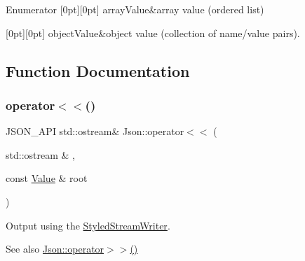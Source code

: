 \begin{DoxyEnumFields}{Enumerator}
[0pt][0pt]{}\mbox{\label{namespace_json_a7d654b75c16a57007925868e38212b4eadc8f264f36b55b063c78126b335415f4}} 
array\+Value&array value (ordered list) \\
\hline

[0pt][0pt]{}\mbox{\label{namespace_json_a7d654b75c16a57007925868e38212b4eae8386dcfc36d1ae897745f7b4f77a1f6}} 
object\+Value&object value (collection of name/value pairs). \\
\hline

\end{DoxyEnumFields}


\subsection{Function Documentation}
\mbox{\label{namespace_json_a0ef6e98bafd4dba52f6ef28ed33913f4}} 
\subsubsection{\texorpdfstring{operator$<$$<$()}{operator<<()}}
{\footnotesize\ttfamily J\+S\+O\+N\+\_\+\+A\+PI std\+::ostream\& Json\+::operator$<$$<$ (\begin{DoxyParamCaption}\item[{std\+::ostream \&}]{,  }\item[{const \mbox{\hyperlink{class_json_1_1_value}{Value}} \&}]{root }\end{DoxyParamCaption})}



Output using the \mbox{\hyperlink{class_json_1_1_styled_stream_writer}{Styled\+Stream\+Writer}}. 

\begin{DoxySeeAlso}{See also}
\mbox{\hyperlink{namespace_json_a1b4aef303177bbd4d18acc87858e0ec2}{Json\+::operator$>$$>$()}} 
\end{DoxySeeAlso}
\mbox{\label{namespace_json_a1b4aef303177bbd4d18acc87858e0ec2}} 
